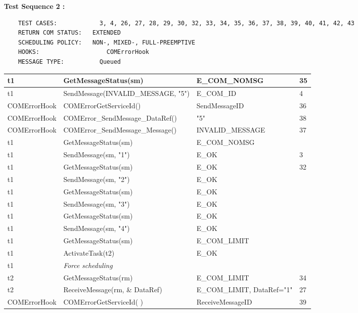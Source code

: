 \documentclass[10pt]{article}
\newlength{\Li}\settowidth{\Li}{Running}
\newlength{\Lii}\setlength{\Lii}{7cm}
\newlength{\Liiii}\setlength{\Liiii}{0.9cm}
\newlength{\Liii}\setlength{\Liii}{\textwidth} \addtolength{\Liii}{-\Li} \addtolength{\Liii}{-\Lii} \addtolength{\Liii}{-\Liiii}
\begin{document}
	\textbf{Test Sequence 2 :}
	\begin{lstlisting}
	TEST CASES:		       3, 4, 26, 27, 28, 29, 30, 32, 33, 34, 35, 36, 37, 38, 39, 40, 41, 42, 43
	RETURN COM STATUS:	 EXTENDED
	SCHEDULING POLICY:   NON-, MIXED-, FULL-PREEMPTIVE
	HOOKS:			         COMErrorHook
	MESSAGE TYPE:	       Queued
	\end{lstlisting}
	
	
	\begin{supertabular}{|p{\Li}|p{\Lii}|p{\Liii}|p{\Liiii}|} \hline 
	t1	& GetMessageStatus(sm)								& E\_COM\_NOMSG					& 35 \\ \hline 
	t1	& SendMessage(INVALID\_MESSAGE, "5") 				& E\_COM\_ID						& 4 \\ \hline  
	COMErrorHook		& COMErrorGetServiceId()				& SendMessageID					& 36 \\ \hline
	COMErrorHook		& COMError\_SendMessage\_DataRef()		& "5"								& 38 \\ \hline
	COMErrorHook		& COMError\_SendMessage\_Message()		& INVALID\_MESSAGE				& 37 \\ \hline
	t1	& GetMessageStatus(sm)								& E\_COM\_NOMSG					& \\ \hline 
	t1	& SendMessage(sm, "1") 								& E\_OK							& 3 \\ \hline  
	t1	& GetMessageStatus(sm)								& E\_OK							& 32 \\ \hline 
	t1	& SendMessage(sm, "2") 								& E\_OK							&  \\ \hline  
	t1	& GetMessageStatus(sm)								& E\_OK							& \\ \hline 
	t1	& SendMessage(sm, "3") 								& E\_OK							&  \\ \hline  
	t1	& GetMessageStatus(sm)								& E\_OK							& \\ \hline 
	t1	& SendMessage(sm, "4") 								& E\_OK							&  \\ \hline  
	t1	& GetMessageStatus(sm)								& E\_COM\_LIMIT					& \\ \hline 
	t1 	& ActivateTask(t2)									& E\_OK							& \\ \hline 
	t1	& \textit{Force scheduling}							&								& \\ \hline
	t2	& GetMessageStatus(rm)								& E\_COM\_LIMIT					& 34 \\ \hline 
	t2	& ReceiveMessage(rm, \& DataRef)						& E\_COM\_LIMIT, DataRef="1"		& 27 \\ \hline 
	COMErrorHook		& COMErrorGetServiceId(	)				& ReceiveMessageID				& 39 \\ \hline

\end{supertabular}
\end{document}
